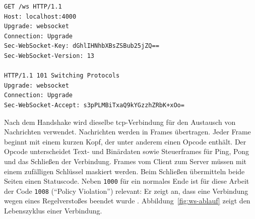\begin{lstlisting}[caption={Aufbau des Opening Handshakes (gekürzt)}, label=lst:handshake, numbers=none]
GET /ws HTTP/1.1
Host: localhost:4000
Upgrade: websocket
Connection: Upgrade
Sec-WebSocket-Key: dGhlIHNhbXBsZSBub25jZQ==
Sec-WebSocket-Version: 13

HTTP/1.1 101 Switching Protocols
Upgrade: websocket
Connection: Upgrade
Sec-WebSocket-Accept: s3pPLMBiTxaQ9kYGzzhZRbK+xOo=
\end{lstlisting}

Nach dem Handshake wird dieselbe \gls{tcp}-Verbindung für den Austausch von Nachrichten verwendet. Nachrichten werden in Frames übertragen. Jeder Frame beginnt mit einem kurzen Kopf, der unter anderem einen Opcode enthält. Der Opcode unterscheidet Text- und Binärdaten sowie Steuerframes für Ping, Pong und das Schließen der Verbindung. Frames vom Client zum Server müssen mit einem zufälligen Schlüssel maskiert werden. Beim Schließen übermitteln beide Seiten einen Statuscode. Neben \texttt{1000} für ein normales Ende ist für diese Arbeit der Code \texttt{1008} (\enquote{Policy Violation}) relevant: Er zeigt an, dass eine Verbindung wegen eines Regelverstoßes beendet wurde . Abbildung~\ref{fig:ws-ablauf} zeigt den Lebenszyklus einer Verbindung.

